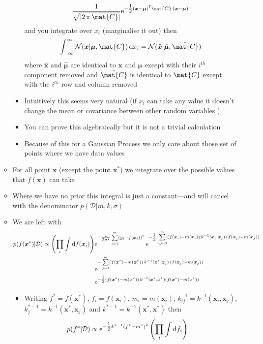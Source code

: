 \documentclass[11pt]{article}
\newcommand{\tr}{\textsf{T}}
\newcommand{\e}[1]{{\rm e}^{#1}}
\newcommand{\dd}{\mathrm{d}}
\begin{document}
\begin{itemize}
\begin{itemize}
\begin{itemize}
$$         \frac{1}{\sqrt{|2\,\pi\, \mat{C}|}} \e{-\tfrac{1}{2}
         (\bm{x}-\bm{\mu})^\tr \mat{C}\, (\bm{x}-\bm{\mu})} $$
and you integrate over \(x_i\) (marginalise it out) then
$$ \int_{-\infty}^{\infty} \mathcal{N}(\bm{x}|
         \bm{\mu},\mat{C}) \, \dd x_i = \mathcal{N}(\hat{\bm{x}}|
         \hat{\bm{\mu}},\hat{\mat{C}}) $$
where \(\hat{\bm{x}}\) and \(\hat{\bm{\mu}}\) are identical to
\(\bm{x}\) and \(\bm{\mu}\) except with their \(i^{th}\) component
removed and \(\hat{\mat{C}}\) is identical to \(\mat{C}\) except
with the \(i^{th}\) row and column removed
\item Intuitively this seems very natural (if \(x_i\) can take any value it
doesn't change the mean or covariance between other random
variables )
\item You can prove this algebraically but it is not a trivial calculation
\item Because of this for a Gaussian Process we only care about
those set of points where we have data values
\end{itemize}
\item For all point \(\bm{x}\) (except the point \(\bm{x}^*\)) we
integrate over the possible values that \(f(\bm{x})\) can take
\item Where we have no prior this integral is just a constant---and
will cancel with the denominator \(p(\mathcal{D}|m,k,\sigma)\)
\item We are left with
\begin{align*}
p(f(\bm{x}^*)|\mathcal{D}) \propto \left(\prod_i \int \dd
f(\bm{x}_i)\right) &
\e{- \tfrac{1}{2\sigma^2} \sum\limits_{i=1}^m (y_i-f(\bm{x}_i))^2 } 
\, \e{-\tfrac{1}{2}\sum\limits_{i,j=1}^m
(f(\bm{x}_i)-m(\bm{x}_i))\, k^{-1}(\bm{x}_i,\bm{x}_j)  \,
(f(\bm{x}_j)-m(\bm{x}_j))}\\
& \e{-\sum\limits_{j=1}^m
(f(\bm{x}^*)-m(\bm{x}^*))\, k^{-1}(\bm{x}^*,\bm{x}_j)  \,
(f(\bm{x}_j)-m(\bm{x}_j)) } \\
& \e{ - \tfrac{1}{2} (f(\bm{x}^*)-m(\bm{x}^*))\, k^{-1}(\bm{x}^*,\bm{x}^*)
(f(\bm{x}^*)-m(\bm{x}^*))}
\end{align*}
\begin{itemize}
\item Writing \(f^*=f(\bm{x}^*)\), \(f_i=f(\bm{x}_i)\), \(m_i=m(\bm{x}_i)\),
\(k^{-1}_{ij} =k^{-1}(\bm{x}_i,\bm{x}_j)\),
\(k^{*-1}_j=k^{-1}(\bm{x}^*,\bm{x}_j)\) and
\(k^{*-1}=k^{-1}(\bm{x}^*,\bm{x}^*)\)  then
\begin{align*}
p(f^*|\mathcal{D}) \propto  \e{-\tfrac{1}{2} k^{*-1}(f^*-m^*)^2} 
 \left(\prod_i \int \dd f_i\right) &

\end{align*}
\end{itemize}
\end{itemize}
\end{itemize}
\end{document}
